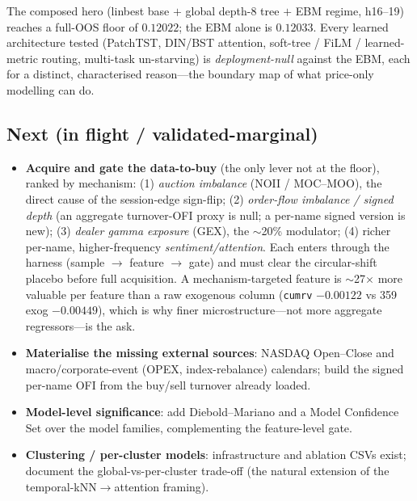 \noindent The composed hero (linbest base $+$ global depth-8 tree $+$ EBM regime,
h16--19) reaches a full-OOS floor of $\mathbf{0.12022}$; the EBM alone is
$0.12033$. Every learned architecture tested (PatchTST, DIN/BST attention,
soft-tree / FiLM / learned-metric routing, multi-task un-starving) is
\emph{deployment-null} against the EBM, each for a distinct, characterised
reason---the boundary map of what price-only modelling can do.

\subsection{Next (in flight / validated-marginal)}
\label{sec:next_june}

\begin{itemize}
\item \textbf{Acquire and gate the data-to-buy} (the only lever not at the floor),
ranked by mechanism: (1) \emph{auction imbalance} (NOII / MOC--MOO), the direct
cause of the session-edge sign-flip; (2) \emph{order-flow imbalance / signed
depth} (an aggregate turnover-OFI proxy is null; a per-name signed version is
new); (3) \emph{dealer gamma exposure} (GEX), the $\sim$20\% modulator;
(4) richer per-name, higher-frequency \emph{sentiment/attention}. Each enters
through the harness (sample $\to$ feature $\to$ gate) and must clear the
circular-shift placebo before full acquisition. A mechanism-targeted feature is
$\sim$27$\times$ more valuable per feature than a raw exogenous column
(\texttt{cumrv} $-0.00122$ vs 359 exog $-0.00449$), which is why finer
microstructure---not more aggregate regressors---is the ask.
\item \textbf{Materialise the missing external sources}: NASDAQ Open--Close and
macro/corporate-event (OPEX, index-rebalance) calendars; build the signed
per-name OFI from the buy/sell turnover already loaded.
\item \textbf{Model-level significance}: add Diebold--Mariano and a Model
Confidence Set over the model families, complementing the feature-level gate.
\item \textbf{Clustering / per-cluster models}: infrastructure and ablation CSVs
exist; document the global-vs-per-cluster trade-off (the natural extension of the
temporal-kNN$\to$attention framing).
\end{itemize}
